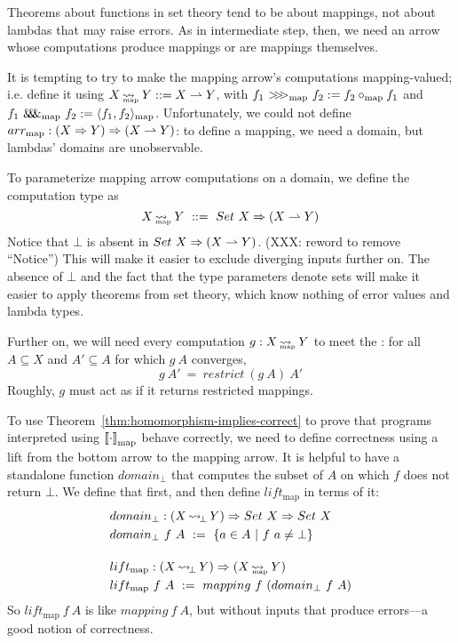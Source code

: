 \documentclass[preprint]{sigplanconf}
\newcommand{\arrow}{\rightsquigarrow}
\newcommand{\pto}{\rightharpoonup}
\newcommand{\arrowlift}{\ensuremath{lift}}
\newcommand{\arrowarr}{\ensuremath{arr}}
\newcommand{\arrowcomp}{\ensuremath{{>}\mspace{-6mu}{>}\mspace{-6mu}{>}}}
\newcommand{\arrowpair}{\ensuremath{\mathit{\&\mspace{-7.5mu}\&\mspace{-7.5mu}\&}}}
\DeclareMathOperator{\botto}{\arrow_{\mspace{-3mu}\bot}}
\newcommand{\map}{_\mathrm{map}}
\DeclareMathOperator{\mapto}{\arrow_{\mspace{-21mu}\map}}
\newcommand{\liftmap}{\arrowlift\map}
\newcommand{\arrmap}{\arrowarr\map}
\newcommand{\compmap}{\arrowcomp\map}
\newcommand{\pairmap}{\arrowpair\map}
\begin{document}
Theorems about functions in set theory tend to be about mappings, not about lambdas that may raise errors.
As in intermediate step, then, we need an arrow whose computations produce mappings or are mappings themselves.

It is tempting to try to make the mapping arrow's computations mapping-valued; i.e. define it using $X \mapto Y ::= X \pto Y$, with $f_1~\compmap~f_2 := f_2 \circ\map f_1$ and $f_1~\pairmap~f_2 := \pair{f_1,f_2}\map$.
Unfortunately, we could not define $\arrmap : (X \tto Y) \tto (X \pto Y)$: to define a mapping, we need a domain, but lambdas' domains are unobservable.

To parameterize mapping arrow computations on a domain, we define the  computation type as
\begin{equation}
	X \mapto Y \ ::= \ Set~X \tto (X \pto Y)
\end{equation}
Notice that $\bot$ is absent in $Set~X \tto (X \pto Y)$. (XXX: reword to remove ``Notice'')
This will make it easier to exclude diverging inputs further on.
The absence of $\bot$ and the fact that the type parameters denote sets will make it easier to apply theorems from set theory, which know nothing of error values and lambda types.

Further on, we will need every computation $g : X \mapto Y$ to meet the :
for all $A \subseteq X$ and $A' \subseteq A$ for which $g~A$ converges,
\begin{equation}
	g~A' \ = \ restrict~(g~A)~A'
\label{eqn:mapping-arrow-restriction-law}
\end{equation}
Roughly, $g$ must act as if it returns restricted mappings.

To use Theorem~\ref{thm:homomorphism-implies-correct} to prove that programs interpreted using $\meaningof{\cdot}\map$ behave correctly, we need to define correctness using a lift from the bottom arrow to the mapping arrow.
It is helpful to have a standalone function $domain_\bot$ that computes the subset of $A$ on which $f$ does not return $\bot$.
We define that first, and then define $\liftmap$ in terms of it:
\begin{align}
	&\begin{aligned}
		&domain_\bot : (X \botto Y) \tto Set~X \tto Set~X \\
		&domain_\bot~f~A \ := \ \setb{a \in A}{f~a \neq \bot}
	\end{aligned} \\
\nonumber \\[-6pt]
	&\begin{aligned}
		&\liftmap : (X \botto Y) \tto (X \mapto Y) \\
		&\liftmap~f~A \ := \ mapping~f~(domain_\bot~f~A)
	\end{aligned}
\end{align}
So $\liftmap~f~A$ is like $mapping~f~A$, but without inputs that produce errors---a good notion of correctness.
\end{document}
